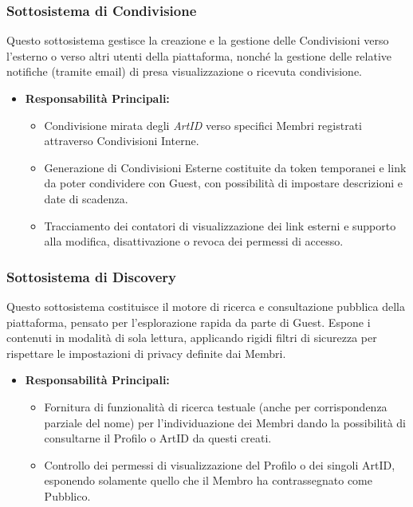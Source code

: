 \subsubsection{Sottosistema di Condivisione}
Questo sottosistema gestisce la creazione e la gestione delle Condivisioni verso l'esterno o verso altri utenti della piattaforma, nonché la gestione delle relative notifiche (tramite email) di presa visualizzazione o ricevuta condivisione.

\begin{itemize}
    \item \textbf{Responsabilità Principali:}
    \begin{itemize}[noitemsep]
        \item Condivisione mirata degli \textit{ArtID} verso specifici Membri registrati attraverso Condivisioni Interne.
        \item Generazione di Condivisioni Esterne costituite da token temporanei e link da poter condividere con Guest, con possibilità di impostare descrizioni e date di scadenza.
        \item Tracciamento dei contatori di visualizzazione dei link esterni e supporto alla modifica, disattivazione o revoca dei permessi di accesso.
    \end{itemize}
\end{itemize}

\subsubsection{Sottosistema di Discovery}
Questo sottosistema costituisce il motore di ricerca e consultazione pubblica della piattaforma, pensato per l'esplorazione rapida da parte di Guest. Espone i contenuti in modalità di sola lettura, applicando rigidi filtri di sicurezza per rispettare le impostazioni di privacy definite dai Membri.

\begin{itemize}
    \item \textbf{Responsabilità Principali:}
    \begin{itemize}[noitemsep]
        \item Fornitura di funzionalità di ricerca testuale (anche per corrispondenza parziale del nome) per l'individuazione dei Membri dando la possibilità di consultarne il Profilo o ArtID da questi creati.
        \item Controllo dei permessi di visualizzazione del Profilo o dei singoli ArtID, esponendo solamente quello che il Membro ha contrassegnato come Pubblico.
    \end{itemize}
\end{itemize}

